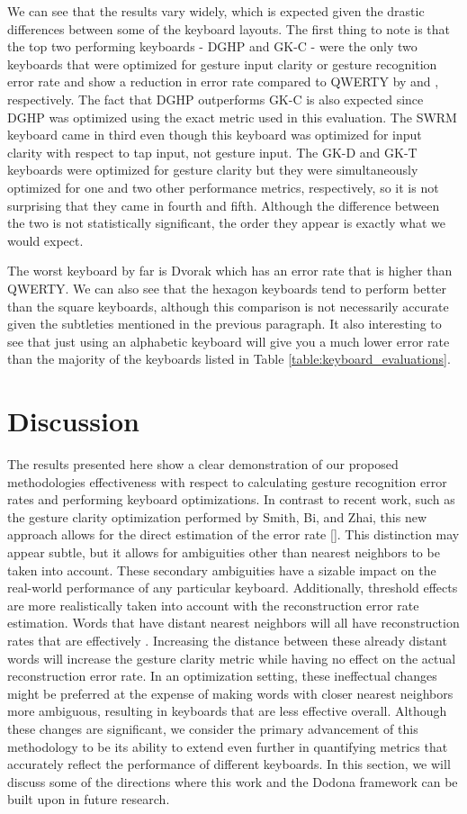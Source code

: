 \documentclass[final,1p,times,authoryear]{elsarticle}
\begin{document}
We can see that the results vary widely, which is expected given the drastic differences between some of the keyboard layouts.
The first thing to note is that the top two performing keyboards - DGHP and GK-C - were the only two keyboards that were optimized for gesture input clarity or gesture recognition error rate and show a reduction in error rate compared to QWERTY by  and , respectively.
The fact that DGHP outperforms GK-C is also expected since DGHP was optimized using the exact metric used in this evaluation.
The SWRM keyboard came in third even though this keyboard was optimized for input clarity with respect to tap input, not gesture input.
The GK-D and GK-T keyboards were optimized for gesture clarity but they were simultaneously optimized for one and two other performance metrics, respectively, so it is not surprising that they came in fourth and fifth.
Although the difference between the two is not statistically significant, the order they appear is exactly what we would expect. 

The worst keyboard by far is Dvorak which has an error rate that is  higher than QWERTY.
We can also see that the hexagon keyboards tend to perform better than the square keyboards, although this comparison is not necessarily accurate given the subtleties mentioned in the previous paragraph.
It also interesting to see that just using an alphabetic keyboard will give you a much lower error rate than the majority of the keyboards listed in Table \ref{table:keyboard_evaluations}.


\section{\textbf{Discussion}}\label{sec:Discussion}
The results presented here show a clear demonstration of our proposed methodologies effectiveness with respect to calculating gesture recognition error rates and performing keyboard optimizations.
In contrast to recent work, such as the gesture clarity optimization performed by Smith, Bi, and Zhai, this new approach allows for the direct estimation of the error rate [\cite{googleKeyboard}].
This distinction may appear subtle, but it allows for ambiguities other than nearest neighbors to be taken into account.
These secondary ambiguities have a sizable impact on the real-world performance of any particular keyboard.
Additionally, threshold effects are more realistically taken into account with the reconstruction error rate estimation.
Words that have distant nearest neighbors will all have reconstruction rates that are effectively .
Increasing the distance between these already distant words will increase the gesture clarity metric while having no effect on the actual reconstruction error rate.
In an optimization setting, these ineffectual changes might be preferred at the expense of making words with closer nearest neighbors more ambiguous, resulting in keyboards that are less effective overall.
Although these changes are significant, we consider the primary advancement of this methodology to be its ability to extend even further in quantifying metrics that accurately reflect the performance of different keyboards.
In this section, we will discuss some of the directions where this work and the Dodona framework can be built upon in future research.
\end{document}
